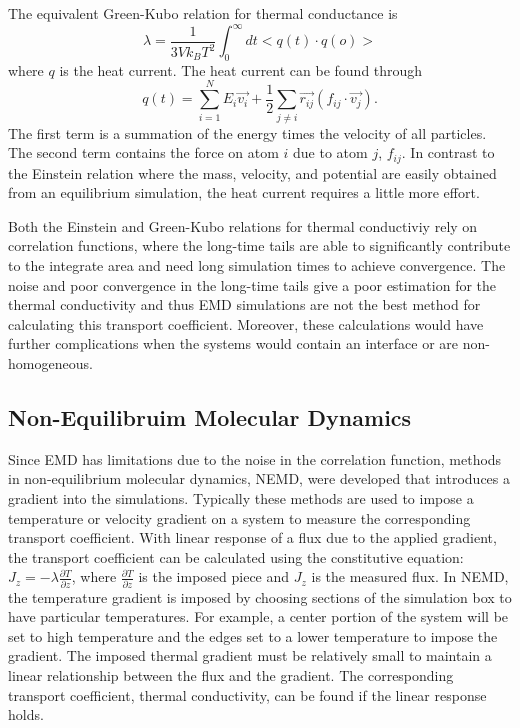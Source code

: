 The equivalent Green-Kubo relation for thermal conductance is
\begin{equation}
    \lambda = \frac{1}{3Vk_BT^2}\int^\infty_0 dt <q(t) \cdot q(o)>
\end{equation}
where $q$ is the heat current.
The heat current can be found through
\begin{equation}
    q(t) = \sum^N_{i=1} E_i \vec{v_i} + \frac{1}{2}\sum_{j \neq i} \vec{r_{ij}} (f_{ij} \cdot \vec{v_j}).
\end{equation}
The first term is a summation of the energy times the velocity of all particles. The second term contains the force on atom $i$ due to atom $j$, $f_{ij}$.
In contrast to the Einstein relation where the mass, velocity, and potential are easily obtained from an equilibrium simulation, the heat current requires a little more effort.

Both the Einstein and Green-Kubo relations for thermal conductiviy rely on correlation functions, where the long-time tails are able to significantly contribute to the integrate area and need long simulation times to achieve convergence.
The noise and poor convergence in the long-time tails give a poor estimation for the thermal conductivity and thus EMD simulations are not the best method for calculating this transport coefficient.
Moreover, these calculations would have further complications when the systems would contain an interface or are non-homogeneous.

\subsection{Non-Equilibruim Molecular Dynamics}
Since EMD has limitations due to the noise in the correlation function, methods in non-equilibrium molecular dynamics, NEMD, were developed that introduces a gradient into the simulations.\cite{Backer:2005sf,Hess:2002nr,Picalek:2009rz, Vasquez:2004ty}
Typically these methods are used to impose a temperature or velocity gradient on a system to measure the corresponding transport coefficient. \cite{Evans:1982oq, Erpenbeck:1984qe, Evans:1986nx, Vogelsang:1988qv, Maginn:1993kl, Hess:2002nr, Schelling:2002dp, Berthier:2002ai, Evans:2002tg, Vasquez:2004ty, Backer:2005sf, Jiang:2008hc, Picalek:2009rz}
With linear response of a flux due to the applied gradient, the transport coefficient can be calculated using the constitutive equation: $J_z = -\lambda \frac{\partial T}{\partial z}$, where $\frac{\partial T}{\partial z}$ is the imposed piece and $J_z$ is the measured flux.
In NEMD, the temperature gradient is imposed by choosing sections of the simulation box to have particular temperatures. For example, a center portion of the system will be set to high temperature and the edges set to a lower temperature to impose the gradient. 
The imposed thermal gradient must be relatively small to maintain a linear relationship between the flux and the gradient. 
The corresponding transport coefficient, thermal conductivity, can be found if the linear response holds.

